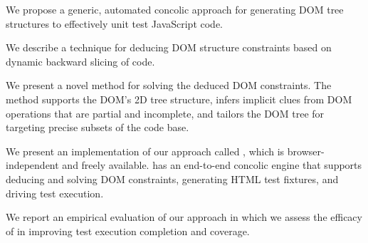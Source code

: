 \begin{compactitem}
\item We propose a generic, automated concolic approach for generating DOM tree structures to effectively unit test JavaScript code. %
\item We describe a technique for deducing DOM structure constraints based on dynamic backward slicing of \js code.
\item We present a novel method for solving the deduced DOM constraints. The method supports the DOM's 2D tree structure, infers implicit clues from DOM operations that are partial and incomplete, and tailors the DOM tree for targeting precise subsets of the code base.
\item We present an implementation of our approach called \tool, which is browser-independent and fr\-eely available. \tool has an end-to-end concolic engine that supports deducing and solving DOM constraints, generating HTML test fixtures, and driving test execution.
\item We report an empirical evaluation of our approach in which we assess the efficacy of \tool in improving test execution completion and coverage.  %
\end {compactitem}






\begin{comment}

1. JavaScript interacts with the DOM and DOM-related \javascript faults are prevalent 
2. Unit testing JavaScript functions required the DOM as input, not any DOM but the DOM in a specific structure
3. Other techniques only focus on input values to functions and ignore the DOM
4. Our technique addresses this important issue by...
5. Our contributions are... our results show that...

\end{comment}
